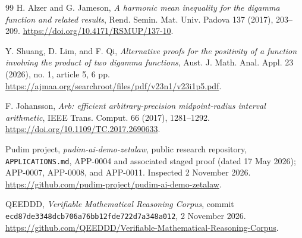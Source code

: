 \begin{thebibliography}{99}
 H. Alzer and G. Jameson,
\emph{A harmonic mean inequality for the digamma function and related results},
Rend. Semin. Mat. Univ. Padova 137 (2017), 203--209.
\url{https://doi.org/10.4171/RSMUP/137-10}.

 Y. Shuang, D. Lim, and F. Qi,
\emph{Alternative proofs for the positivity of a function involving the
product of two digamma functions}, Aust. J. Math. Anal. Appl. 23 (2026),
no. 1, article 5, 6 pp.
\url{https://ajmaa.org/searchroot/files/pdf/v23n1/v23i1p5.pdf}.

 F. Johansson,
\emph{Arb: efficient arbitrary-precision midpoint-radius interval arithmetic},
IEEE Trans. Comput. 66 (2017), 1281--1292.
\url{https://doi.org/10.1109/TC.2017.2690633}.

 Pudim project,
\emph{pudim-ai-demo-zetalaw}, public research repository,
\texttt{APPLICATIONS.md}, APP-0004 and associated staged proof
(dated 17 May 2026); APP-0007, APP-0008, and APP-0011.
Inspected 2 November 2026.
\url{https://github.com/pudim-project/pudim-ai-demo-zetalaw}.

 QEEDDD,
\emph{Verifiable Mathematical Reasoning Corpus},
commit \texttt{ecd87de3348dcb706a76bb12fde722d7a348a012},
2 November 2026.
\url{https://github.com/QEEDDD/Verifiable-Mathematical-Reasoning-Corpus}.
\end{thebibliography}


